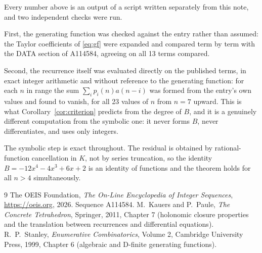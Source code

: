 \documentclass[11pt,a4paper]{article}
\theoremstyle{plain}
\theoremstyle{definition}
\begin{document}
Every number above is an output of a script written separately from this note, and two
independent checks were run.

First, the generating function was checked against the entry rather than assumed: the
Taylor coefficients of \eqref{eq:gf} were expanded and compared term by term with the DATA
section of A114584, agreeing on all 13 terms compared.

Second, the recurrence itself was evaluated directly on the published terms, in exact
integer arithmetic and without reference to the generating function: for each $n$ in range
the sum $\sum_{i}p_{i}(n)a(n-i)$ was formed from the entry's own values and found to
vanish, for all 23 values of $n$ from $n=7$ upward. This is what
Corollary~\ref{cor:criterion} predicts from the degree of $B$, and it is a genuinely
different computation from the symbolic one: it never forms $B$, never differentiates, and
uses only integers.

The symbolic step is exact throughout. The residual is obtained by rational-function
cancellation in $K$, not by series truncation, so the identity $B=- 12 x^{4} - 4 x^{3} + 6 x + 2$ is an
identity of functions and the theorem holds for all $n>4$ simultaneously.

\begin{thebibliography}{9}
 The OEIS Foundation, \emph{The On-Line Encyclopedia of Integer Sequences},
\url{https://oeis.org}, 2026. Sequence A114584.
 M.~Kauers and P.~Paule, \emph{The Concrete Tetrahedron}, Springer, 2011,
Chapter 7 (holonomic closure properties and the translation between recurrences and
differential equations).
 R.~P.~Stanley, \emph{Enumerative Combinatorics}, Volume 2, Cambridge
University Press, 1999, Chapter 6 (algebraic and D-finite generating functions).
\end{thebibliography}
\end{document}
